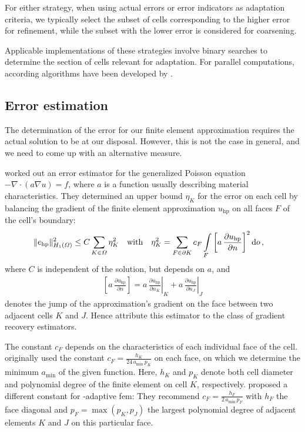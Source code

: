 For either strategy, when using actual errors or error indicators as adaptation criteria, we typically select the subset of cells corresponding to the higher error for refinement, while the subset with the lower error is considered for coarsening.

Applicable implementations of these strategies involve binary searches to determine the section of cells relevant for adaptation. For parallel computations, according algorithms have been developed by \textcites[Sec.~3.1]{burstedde2008}[Sec.~5.1]{bangerth2012}.



\subsection{Error estimation}
\label{ssec:estimation}

The determination of the error for our finite element approximation requires the actual solution to be at our disposal. However, this is not the case in general, and we need to come up with an alternative measure.

\textcite{kelly1983} worked out an error estimator for the generalized Poisson equation $-\nabla \cdot \left( a \nabla u \right) = f$, where $a$ is a function usually describing material characteristics. They determined an upper bound $\eta_K$ for the error on each cell by balancing the gradient of the finite element approximation $u_\text{hp}$ on all faces $F$ of the cell's boundary:
\begin{align}
\label{eq:kelly} \|e_\text{hp}\|_{H_1(\Omega)}^2 &\leq C \sum\limits_{K \in \Omega} \eta_K^2 &&\text{with}&  \eta_K^2 &= \sum\limits_{F \in \partial K} c_F \int\limits_{F} \left[ a \, \frac{\partial u_\text{hp}}{\partial n} \right]^2 \mathop{}\!\mathrm{d}o \,\text{,}
\end{align}
where $C$ is independent of the solution, but depends on $a$, and
\begin{align*}
\left[ a \, \frac{\partial u_\text{hp}}{\partial n} \right] = \left. a \, \frac{\partial u_\text{hp}}{\partial n_K} \right|_K + \left. a \, \frac{\partial u_\text{hp}}{\partial n_J}\right|_J
\end{align*}
denotes the jump of the approximation's gradient on the face between two adjacent cells $K$ and $J$. Hence \textcite{ainsworth1997a} attribute this estimator to the class of gradient recovery estimators.

The constant $c_F$ depends on the characteristics of each individual face of the cell. \textcite{kelly1983} originally used the constant $c_F = \frac{h_K}{24 \, a_\text{min} \, p_K}$ on each face, on which we determine the minimum $a_\text{min}$ of the given function. Here, $h_K$ and $p_K$ denote both cell diameter and polynomial degree of the finite element on cell $K$, respectively. \textcite{davydov2017} proposed a different constant for \hp-adaptive \gls{fem}: They recommend $c_F = \frac{h_F}{2 \, a_\text{min} \, p_F}$ with $h_F$ the face diagonal and $p_F = \max\left(p_K, p_J\right)$ the largest polynomial degree of adjacent elements $K$ and $J$ on this particular face.

